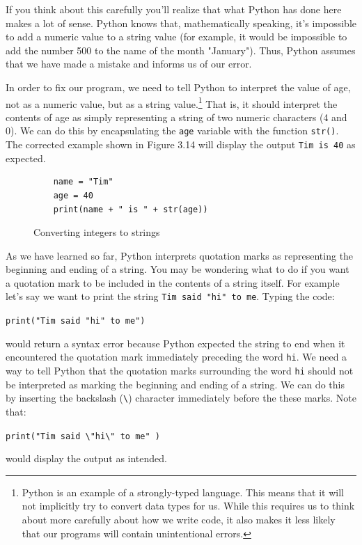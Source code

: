 \documentclass{book}
\begin{document}
If you think about this carefully you'll realize that what Python has done here makes a lot of sense. Python knows that, mathematically speaking, it's impossible to add a numeric value to a string value (for example, it would be impossible to add the number 500 to the name of the month "January"). Thus, Python assumes that we have made a mistake and informs us of our error. 

In order to fix our program, we need to tell Python to interpret the value of age, not as a numeric value, but as a string value.\footnote{Python is an example of a strongly-typed language. This means that it will not implicitly try to convert data types for us. While this requires us to think about more carefully about how we write code, it also makes it less likely that our programs will contain unintentional errors.} That is, it should interpret the contents of age as simply representing a string of two numeric characters (4 and 0). We can do this by encapsulating the \texttt{age} variable with the function \texttt{str()}. The corrected example shown in Figure 3.14 will display the output \texttt{Tim is 40} as expected.

\begin{figure}[h]
	\caption{Converting integers to strings}
	\begin{lstlisting}
	name = "Tim"
	age = 40
	print(name + " is " + str(age))
	\end{lstlisting}
\end{figure}

As we have learned so far, Python interprets quotation marks as representing the beginning and ending of a string. You may be wondering what to do if you want a quotation mark to be included in the contents of a string itself. For example let's say we want to print the string \texttt{Tim said "hi" to me}. Typing the code:

\texttt{print("Tim said "hi" to me")}

would return a syntax error because Python expected the string to end when it encountered the quotation mark immediately preceding the word \texttt{hi}. We need a way to tell Python that the quotation marks surrounding the word \texttt{hi} should not be interpreted as marking the beginning and ending of a string. We can do this by inserting the backslash (\texttt{\textbackslash}) character immediately before the these marks. Note that:

\texttt{print("Tim said \textbackslash"hi\textbackslash" to me" )}

would display the output as intended.
\end{document}
